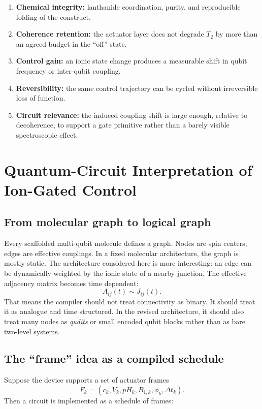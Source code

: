 \documentclass[11pt]{report}
\theoremstyle{definition}
\begin{document}
\begin{enumerate}[leftmargin=2em]
\item \textbf{Chemical integrity:} lanthanide coordination, purity, and reproducible folding of the construct.
\item \textbf{Coherence retention:} the actuator layer does not degrade $T_2$ by more than an agreed budget in the ``off'' state.
\item \textbf{Control gain:} an ionic state change produces a measurable shift in qubit frequency or inter-qubit coupling.
\item \textbf{Reversibility:} the same control trajectory can be cycled without irreversible loss of function.
\item \textbf{Circuit relevance:} the induced coupling shift is large enough, relative to decoherence, to support a gate primitive rather than a barely visible spectroscopic effect.
\end{enumerate}

\chapter{Quantum-Circuit Interpretation of Ion-Gated Control}

\section{From molecular graph to logical graph}
Every scaffolded multi-qubit molecule defines a graph. Nodes are spin centers; edges are effective couplings. In a fixed molecular architecture, the graph is mostly static. The architecture considered here is more interesting: an edge can be dynamically weighted by the ionic state of a nearby junction. The effective adjacency matrix becomes time dependent:
\[
A_{ij}(t) \sim J_{ij}(t).
\]
That means the compiler should not treat connectivity as binary. It should treat it as analogue and time structured. In the revised architecture, it should also treat many nodes as \emph{qudits} or small encoded qubit blocks rather than as bare two-level systems.

\section{The ``frame'' idea as a compiled schedule}
Suppose the device supports a set of actuator frames
\[
F_k = \left(c_k, V_k, pH_k, B_{1,k}, \phi_k, \Delta t_k\right).
\]
Then a circuit is implemented as a schedule of frames:
\end{document}
